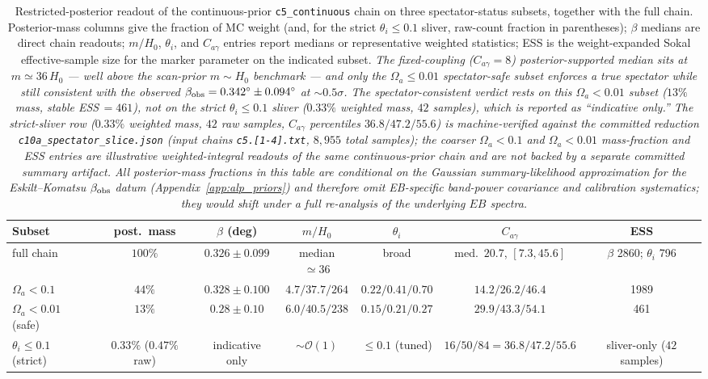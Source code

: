 \documentclass[aps,prd,twocolumn,superscriptaddress,showpacs,preprintnumbers,nofootinbib,longbibliography,floatfix]{revtex4-2}
\begin{document}
\begin{table}[ht]
\caption{\label{tab:alp_restricted_subsets} Restricted-posterior readout
of the continuous-prior \texttt{c5\_continuous} chain on three
spectator-status subsets, together with the full chain. Posterior-mass
columns give the fraction of MC weight (and, for the strict $\theta_i\le
0.1$ sliver, raw-count fraction in parentheses); $\beta$ medians are
direct chain readouts; $m/H_0$, $\theta_i$, and $C_{a\gamma}$ entries
report medians or representative weighted statistics; ESS is the
weight-expanded Sokal effective-sample size for the marker parameter on
the indicated subset. \emph{The fixed-coupling ($C_{a\gamma}=8$)
posterior-supported median sits at $m\simeq 36\,H_0$ --- well above the
scan-prior $m\sim H_0$ benchmark --- and only the $\Omega_a\le 0.01$
spectator-safe subset enforces a true spectator while still consistent
with the observed $\beta_{\rm obs}=0.342^\circ\pm 0.094^\circ$ at
${\sim}0.5\sigma$. The spectator-consistent verdict rests on this
$\Omega_a<0.01$ subset ($13\%$ mass, stable ESS\,$=461$), \emph{not} on
the strict $\theta_i\le 0.1$ sliver ($0.33\%$ weighted mass, $42$
samples), which is reported as ``indicative only.'' The strict-sliver row
($0.33\%$ weighted mass, $42$ raw samples, $C_{a\gamma}$ percentiles
$36.8/47.2/55.6$) is machine-verified against the committed reduction
\texttt{c10a\_spectator\_slice.json} (input chains \texttt{c5.[1-4].txt},
$8{,}955$ total samples); the coarser $\Omega_a<0.1$ and $\Omega_a<0.01$
mass-fraction and ESS entries are \emph{illustrative} weighted-integral
readouts of the same continuous-prior chain and are not backed by a separate
committed summary artifact. All posterior-mass
fractions in this table are conditional on the Gaussian summary-likelihood
approximation for the Eskilt--Komatsu $\beta_{\rm obs}$ datum
(Appendix~\ref{app:alp_priors}) and therefore omit EB-specific band-power
covariance and calibration systematics; they would shift under a full
re-analysis of the underlying $EB$ spectra.}}
\begin{ruledtabular}
\scriptsize
\begin{tabular}{lcccccc}
Subset & post.\ mass & $\beta$ (deg) & $m/H_0$ & $\theta_i$ & $C_{a\gamma}$ & ESS \\
\hline
full chain                 & $100\%$                  & $0.326\pm 0.099$  & median $\simeq 36$         & broad                 & med.\ $20.7$, $[7.3,45.6]$    & $\beta$ 2860; $\theta_i$ 796 \\
$\Omega_a<0.1$             & $44\%$                   & $0.328\pm 0.100$  & $4.7/37.7/264$  & $0.22/0.41/0.70$  & $14.2/26.2/46.4$  & 1989 \\
$\Omega_a<0.01$ (safe)     & $13\%$                   & $0.28\pm 0.10$    & $6.0/40.5/238$  & $0.15/0.21/0.27$  & $29.9/43.3/54.1$  & 461  \\
$\theta_i\le 0.1$ (strict) & $0.33\%$ ($0.47\%$ raw)  & indicative only   & $\sim\mathcal{O}(1)$       & $\le 0.1$ (tuned)     & $16/50/84\!=\!36.8/47.2/55.6$ & sliver-only ($42$ samples)   \\
\end{tabular}
\end{ruledtabular}
\end{table}
\end{document}
